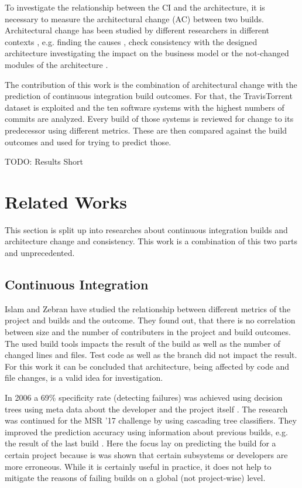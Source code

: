 \documentclass[conference]{IEEEtran}
\begin{document}
To investigate the relationship between the CI and the architecture, it is necessary to measure the architectural change (AC) between two builds. Architectural change has been studied by different researchers in different contexts \cite{Aramis,StructDist,Arc-MDSE,Arcade-Base} , e.g.  finding the causes \cite{AC-Causes}, check consistency with the designed architecture \cite{ArcConf, ArcCons} investigating the impact on the business model \cite{ArcChange-Business} or the not-changed modules of the architecture \cite{Knowledge-AC}. 

The contribution of this work is the combination of architectural change with the prediction of continuous integration build outcomes. For that, the TravisTorrent dataset is exploited and the ten software systems with the highest numbers of commits are analyzed. Every build of those systems is reviewed for change to its predecessor using different metrics. These are then compared against the build outcomes and used for trying to predict those.

TODO: Results Short

\section{Related Works}

This section is split up into researches about continuous integration builds and architecture change and consistency. This work is a combination of this two parts and unprecedented. 

\subsection{Continuous Integration}

Islam and Zebran \cite{FailsCorr} have studied the relationship between different metrics of the project and builds and the outcome. They found out, that there is no correlation between size and the number of contributers in the project and build outcomes. The used build tools impacts the result of the build as well as the number of changed lines and files. Test code as well as the branch did not impact the result. For this work it can be concluded that architecture, being affected by code and file changes, is a valid idea for investigation. 

In 2006 a 69\% specificity rate (detecting failures) was achieved using decision trees using meta data about the developer and the project itself \cite{Pred-Tree}.
The research was continued for the MSR '17 challenge by using cascading tree classifiers. They improved the prediction accuracy using information about previous builds, e.g. the result of the last build \cite{Pred-Cascade}. 
Here the focus lay on predicting the build for a certain project because is was shown that certain subsystems or developers are more erroneous. While it is certainly useful in practice, it does not help to mitigate the reasons of failing builds on a global (not project-wise) level.
\end{document}
